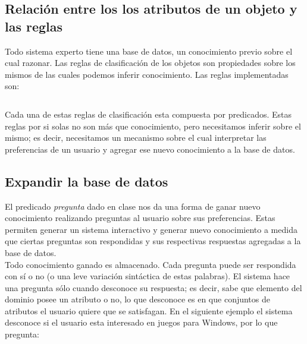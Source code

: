 \documentclass[11pt,oneside,a4paper]{article}
\begin{document}
\subsection{Relación entre los los atributos de un objeto y las reglas}


Todo sistema experto tiene una base de datos, un conocimiento previo sobre el
cual razonar. Las reglas de clasificación de los objetos son propiedades
sobre los mismos de las cuales podemos inferir conocimiento. Las reglas 
implementadas son:

\inputminted[firstline=17, lastline=31, fontsize=\footnotesize]{prolog}{tp-prolog.pl}

Cada una de estas reglas de clasificación esta compuesta por predicados.
Estas reglas por si solas no son más que conocimiento, pero necesitamos inferir 
sobre el mismo; es decir, necesitamos un mecanismo sobre el cual interpretar las preferencias 
de un usuario y agregar ese nuevo conocimiento a la base de datos.

\subsection{Expandir la base de datos}

El predicado \emph{pregunta} dado en clase nos da una forma de ganar nuevo conocimiento
realizando preguntas al usuario sobre sus preferencias.
Estas permiten generar un sistema interactivo y generar nuevo %
conocimiento a medida que ciertas preguntas son respondidas y sus respectivas respuestas
agregadas a la base de datos.\\



Todo conocimiento ganado es almacenado.
Cada pregunta puede ser respondida con sí o no (o una leve variación 
sintáctica de estas palabras). El sistema hace una pregunta 
sólo cuando desconoce su respuesta; es decir, sabe que elemento del dominio 
posee un atributo o no, lo que desconoce es en que conjuntos de atributos 
el usuario quiere que se satisfagan. En el siguiente ejemplo el 
sistema desconoce si el usuario esta interesado en juegos para Windows, por lo
que pregunta:
\end{document}
